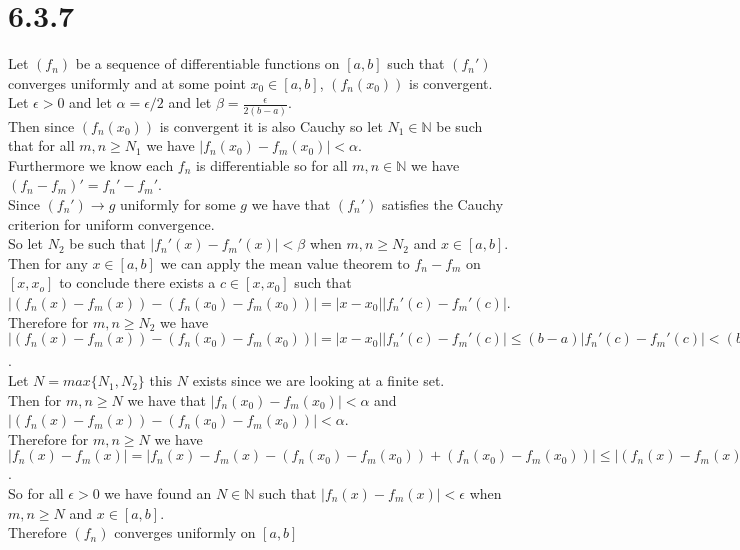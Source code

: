 \documentclass{article}
\begin{document}
\newpage
\section*{6.3.7}
\begin{center}
    \doublespacing
    Let $(f_n)$ be a sequence of differentiable functions on $[a, b]$ such that $(f_n')$ converges uniformly and at some point $x_0\in [a, b]$, $(f_n (x_0))$ is convergent.
    \\Let $\epsilon > 0$ and let $\alpha =\epsilon / 2$ and let $\beta =\frac{\epsilon}{2(b-a)}$.
    \\Then since $(f_n (x_0))$ is convergent it is also Cauchy so let $N_1\in\mathbb{N}$ be such that for all $m, n\geq N_1$ we have $|f_n (x_0) - f_m (x_0)| <\alpha$.
    \break
    \\Furthermore we know each $f_n$ is differentiable so for all $m, n\in\mathbb{N}$ we have $(f_n - f_m)' = f_n' - f_m'$.
    \\Since $(f_n')\rightarrow g$ uniformly for some $g$ we have that $(f_n')$ satisfies the Cauchy criterion for uniform convergence.
    \\So let $N_2$ be such that $|f_n'(x) - f_m'(x)| <\beta$ when $m, n\geq N_2$ and $x\in [a, b]$.
    \\Then for any $x\in [a, b]$ we can apply the mean value theorem to $f_n - f_m$ on $[x, x_o]$ to conclude there exists a $c\in [x, x_0]$ such that $|(f_n (x) - f_m(x)) - (f_n (x_0) - f_m (x_0))| = |x - x_0||f_n' (c) - f_m' (c)|$.
    \\Therefore for $m, n\geq N_2$ we have $|(f_n (x) - f_m(x)) - (f_n (x_0) - f_m (x_0))| = |x - x_0||f_n' (c) - f_m' (c)|\leq (b - a)|f_n'(c) - f_m'(c)| < (b-a)\beta = (b-a)\frac{\epsilon}{2(b-a)} =\epsilon / 2 =\alpha$.
    \break
    \\Let $N = max\{N_1, N_2\}$ this $N$ exists since we are looking at a finite set.
    \\Then for $m, n\geq N$ we have that $|f_n (x_0) - f_m (x_0)| <\alpha$ and $|(f_n (x) - f_m(x)) - (f_n (x_0) - f_m (x_0))| <\alpha$.
    \\Therefore for $m, n\geq N$ we have $|f_n (x) - f_m (x)| = |f_n (x) - f_m (x) - (f_n (x_0) - f_m (x_0)) + (f_n (x_0) - f_m (x_0))|\leq |(f_n (x) - f_m(x)) - (f_n (x_0) - f_m (x_0))| + |f_n (x_0) - f_m (x_0)| < 2\alpha =\epsilon$.
    \\So for all $\epsilon > 0$ we have found an $N\in\mathbb{N}$ such that $|f_n (x) - f_m (x)| <\epsilon$ when $m, n\geq N$ and $x\in [a, b]$.
    \\Therefore $(f_n)$ converges uniformly on $[a, b]$ \qedsymbol
\end{center}
\end{document}
